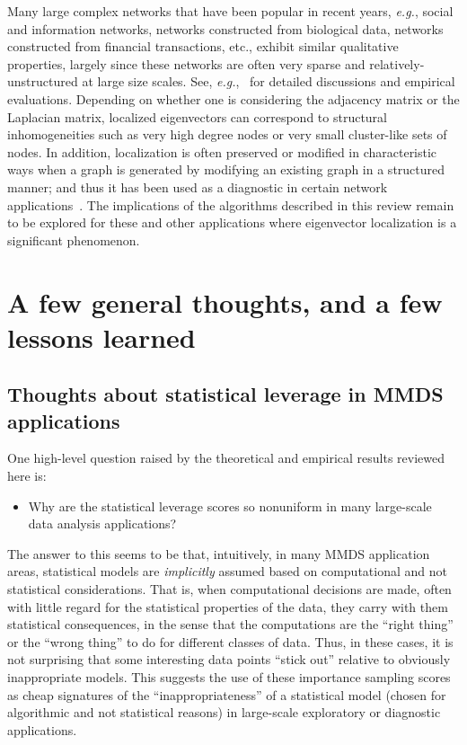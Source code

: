 \documentclass[twoside]{article}
\begin{document}
Many large complex networks that have been popular in recent years, 
\emph{e.g.}, social and information networks, networks constructed from 
biological data, networks constructed from financial transactions, etc., 
exhibit similar qualitative properties, largely since these networks are 
often very sparse and relatively-unstructured at large size scales.
See, \emph{e.g.},~\cite{FDBV01,GKK01,DGMS03,MT09} for detailed discussions 
and empirical evaluations.
Depending on whether one is considering the adjacency matrix or the 
Laplacian matrix, localized eigenvectors can correspond to structural 
inhomogeneities such as very high degree nodes or very small cluster-like 
sets of nodes.
In addition, localization is often preserved or modified in characteristic 
ways when a graph is generated by modifying an existing graph in a 
structured manner; and thus it has been used as a diagnostic in certain 
network applications~\cite{BJ09a,BJ08a}.
The implications of the algorithms described in this review remain to be 
explored for these and other applications where eigenvector localization is 
a significant phenomenon. 




 
 \section{A few general thoughts, and a few lessons learned}
\label{sxn:thoughts}

\subsection{Thoughts about statistical leverage in MMDS applications}

One high-level question raised by the theoretical and empirical results 
reviewed here is: 
\begin{itemize}
\item
Why are the statistical leverage scores 
so nonuniform in many large-scale data analysis applications?
\end{itemize}
The answer to this seems to be that, intuitively, in many MMDS application 
areas, statistical models are \emph{implicitly} assumed based on 
computational and not statistical considerations.
That is, when computational decisions are made, often with little regard 
for the statistical properties of the data, they carry with them statistical 
consequences, in the sense that the computations are the ``right thing'' or 
the ``wrong thing'' to do for different classes of data.
Thus, in these cases, it is not surprising that some interesting data points 
``stick out'' relative to obviously inappropriate models.
This suggests the use of these importance sampling scores as cheap 
signatures of the ``inappropriateness'' of a statistical model (chosen for 
algorithmic and not statistical reasons) in large-scale exploratory or
diagnostic applications.
\end{document}
